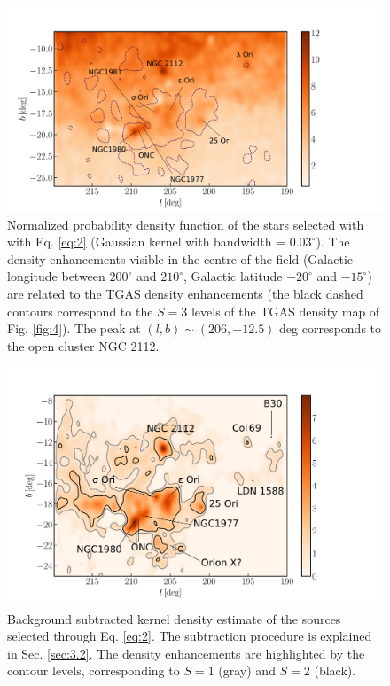 \documentclass[onecolumn]{aa} %
\begin{document}
\begin{figure}
\includegraphics[width = \hsize, keepaspectratio]{fig8_labels.pdf}%
\caption{Normalized probability density function of the stars selected with with Eq. \eqref{eq:2} (Gaussian kernel with bandwidth = $0.03^{\circ}$). The density enhancements visible in the centre of the field (Galactic longitude between $200^{\circ}$ and $210^{\circ}$, Galactic latitude $-20^{\circ}$ and $-15^{\circ}$) are related to the TGAS density enhancements (the black dashed contours correspond to the $S = 3$ levels of the TGAS density map of Fig. \ref{fig:4}).  The peak at $(l, b) \sim (206, -12.5)$ deg corresponds to  the open cluster NGC 2112. 
}
\label{fig:7}
\end{figure}
\begin{figure}
\includegraphics[width = \textwidth, keepaspectratio]{fig9_labels.pdf}
\caption{Background subtracted kernel density estimate of the sources selected through Eq. \eqref{eq:2}. The subtraction procedure is explained in Sec. \ref{sec:3.2}. The density enhancements are highlighted by the contour levels, corresponding to $S =1$ (gray) and $S = 2$ (black).
}
\label{fig:8}
\end{figure}
\end{document}
